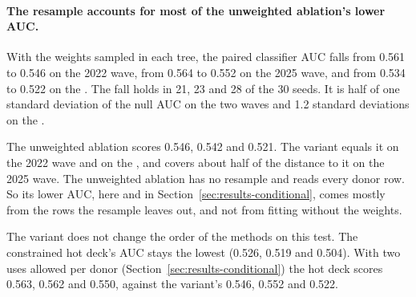 
\paragraph{The resample accounts for most of the unweighted ablation's lower
AUC.} With the weights sampled in each tree, the paired classifier AUC falls
from 0.561 to 0.546 on the 2022 wave, from 0.564 to 0.552 on the 2025 wave,
and from 0.534 to 0.522 on the \cps{}. The fall holds in 21, 23 and 28 of the
30 seeds. It is half of one standard deviation of the null AUC on the two
\scf{} waves and 1.2 standard deviations on the \cps{}.

The unweighted ablation scores 0.546, 0.542 and 0.521. The variant equals it
on the 2022 wave and on the \cps{}, and covers about half of the distance to
it on the 2025 wave. The unweighted ablation has no resample and reads every
donor row. So its lower AUC, here and in
Section~\ref{sec:results-conditional}, comes mostly from the rows the
resample leaves out, and not from fitting without the weights.

The variant does not change the order of the methods on this test. The
constrained hot deck's AUC stays the lowest (0.526, 0.519 and 0.504). With
two uses allowed per donor (Section~\ref{sec:results-conditional}) the hot
deck scores 0.563, 0.562 and 0.550, against the variant's 0.546, 0.552 and
0.522.

